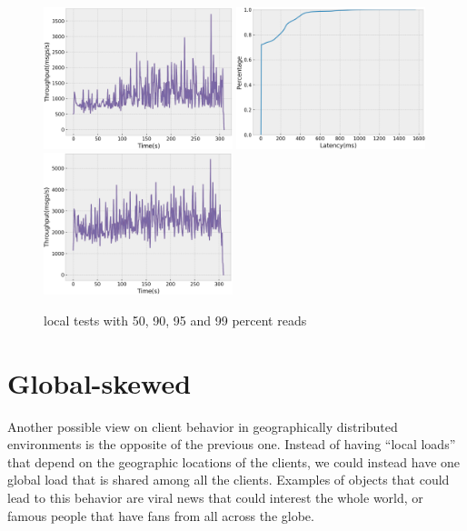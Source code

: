 \begin{figure}[H]
  \includegraphics[width=0.49\textwidth,height=\textheight,keepaspectratio]{img/local5_tp.png}
  \includegraphics[width=0.49\textwidth,height=\textheight,keepaspectratio]{img/local1_lat.png}
  \includegraphics[width=0.49\textwidth,height=\textheight,keepaspectratio]{img/local1_tp.png}
  \caption{ local tests with 50, 90, 95 and 99 percent reads }
  \label{fig:local50-performance}
\end{figure}

\section{Global-skewed}\label{sec:global-skewed}
Another possible view on client behavior in geographically distributed environments is the opposite of the previous one. Instead of having ``local loads'' that depend on the geographic locations of the clients, we could instead have one global load that is shared among all the clients. Examples of objects that could lead to this behavior are viral news that could interest the whole world, or famous people that have fans from all across the globe.

